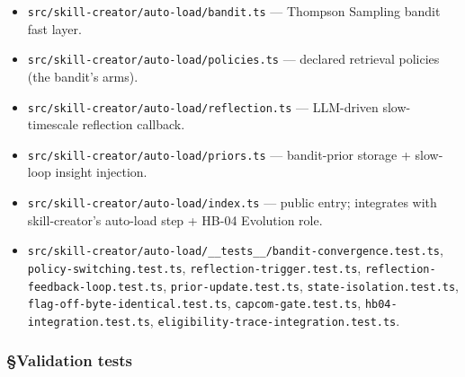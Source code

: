 \documentclass[11pt,letterpaper]{article}
\providecommand{\tightlist}{\setlength{\itemsep}{0pt}\setlength{\parskip}{0pt}}
\begin{document}
\begin{itemize}
\tightlist
\item
  \texttt{src/skill-creator/auto-load/bandit.ts} --- Thompson Sampling
  bandit fast layer.
\item
  \texttt{src/skill-creator/auto-load/policies.ts} --- declared
  retrieval policies (the bandit's arms).
\item
  \texttt{src/skill-creator/auto-load/reflection.ts} --- LLM-driven
  slow-timescale reflection callback.
\item
  \texttt{src/skill-creator/auto-load/priors.ts} --- bandit-prior
  storage + slow-loop insight injection.
\item
  \texttt{src/skill-creator/auto-load/index.ts} --- public entry;
  integrates with skill-creator's auto-load step + HB-04 Evolution role.
\item
  \texttt{src/skill-creator/auto-load/\_\_tests\_\_/bandit-convergence.test.ts},
  \texttt{policy-switching.test.ts},
  \texttt{reflection-trigger.test.ts},
  \texttt{reflection-feedback-loop.test.ts},
  \texttt{prior-update.test.ts}, \texttt{state-isolation.test.ts},
  \texttt{flag-off-byte-identical.test.ts},
  \texttt{capcom-gate.test.ts}, \texttt{hb04-integration.test.ts},
  \texttt{eligibility-trace-integration.test.ts}.
\end{itemize}

\subsubsection{§Validation tests}
\end{document}

